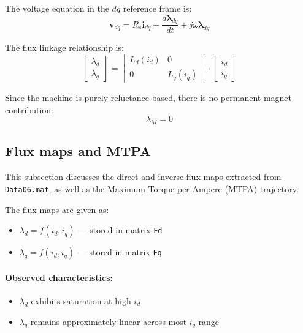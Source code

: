 The voltage equation in the $dq$ reference frame is:
\begin{equation}
\mathbf{v}_{dq} = R_s \mathbf{i}_{dq} + \frac{d \boldsymbol{\lambda}_{dq}}{dt} + j \omega \boldsymbol{\lambda}_{dq}
\end{equation}

The flux linkage relationship is:
\begin{equation}
\begin{bmatrix}
\lambda_d \\ \lambda_q
\end{bmatrix}
=
\begin{bmatrix}
L_d(i_d) & 0 \\
0 & L_q(i_q)
\end{bmatrix}
\cdot
\begin{bmatrix}
i_d \\ i_q
\end{bmatrix}
\end{equation}

Since the machine is purely reluctance-based, there is no permanent magnet contribution:
\begin{equation}
\lambda_M = 0
\end{equation}

\subsection{Flux maps and MTPA}
This subsection discusses the direct and inverse flux maps extracted from \texttt{Data06.mat}, as well as the Maximum Torque per Ampere (MTPA) trajectory.

The flux maps are given as:
\begin{itemize}
    \item $\lambda_d = f(i_d, i_q)$ — stored in matrix \texttt{Fd}
    \item $\lambda_q = f(i_d, i_q)$ — stored in matrix \texttt{Fq}
\end{itemize}

\paragraph{Observed characteristics:}
\begin{itemize}
    \item $\lambda_d$ exhibits saturation at high $i_d$
    \item $\lambda_q$ remains approximately linear across most $i_q$ range
\end{itemize}

